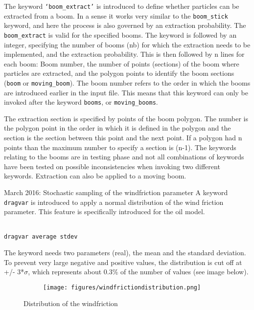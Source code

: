 \documentclass[english]{deltares_manual}
\begin{document}
The keyword \texttt{‘boom\_extract’} is introduced to define whether particles can be extracted from a boom. In a sense it works very similar to the \texttt{boom\_stick} keyword, and here the process is also governed by an extraction probability. The \texttt{boom\_extract} is valid for the specified booms. The keyword is followed by an integer, specifying the number of booms (nb) for which the extraction needs to be implemented, and the extraction probability. This is then followed by n lines for each boom:
Boom number, the number of points (sections) of the boom where particles are extracted, and the polygon points to identify the boom sections (\texttt{boom} or \texttt{moving\_boom}). 
The boom number refers to the order in which the booms are introduced earlier in the input file. This means that this keyword can only be invoked after the keyword \texttt{booms}, or \texttt{moving\_booms}. 

The extraction section is specified by points of the boom polygon. The number is the polygon point in the order in which it is defined in the polygon and the section is the section between this point and the next point. If a polygon had n points than the maximum number to specify a section is (n-1). 
The keywords relating to the booms are in testing phase and not all combinations of keywords have been tested on possible inconsistencies when invoking two different keywords. 
Extraction can also be applied to a moving boom. 

March 2016: Stochastic sampling of the windfriction parameter
A keyword \texttt{dragvar} is introduced to apply a normal distribution of the wind friction parameter. This feature is specifically introduced for the oil model. 
\begin{tcolorbox}
	\footnotesize
	\texttt{\\
	dragvar average   stdev
}
\end{tcolorbox}

The keyword needs two parameters (real), the mean and the standard deviation. To prevent very large negative and positive values, the distribution is cut off at +/- 3*$\sigma$, which represents about 0.3\% of the number of values (see image below). 
\begin{figure}[H]%
	\begin{subfigure}{0.5\textwidth}
		\texttt{[image: figures/windfrictiondistribution.png]}%
	\end{subfigure}
	\caption{Distribution of the windfriction}
	\label{fig:windfrictiondistribution}
\end{figure}
\end{document}
